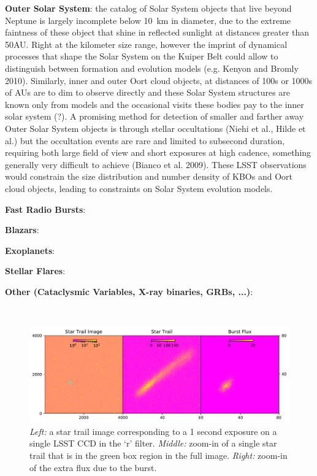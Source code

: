 \documentclass[12pt, letterpaper]{article}
\begin{document}
{\bf Outer Solar System}: the catalog of Solar System objects that live beyond Neptune is largely incomplete below 10~km in diameter, due to the extreme faintness of these object that shine in reflected sunlight at distances greater than 50AU. Right at the kilometer size range, however the imprint of dynamical processes that shape the Solar System on the Kuiper Belt could allow to distinguish between formation and evolution models (e.g. Kenyon and Bromly 2010). Similarly, inner and outer Oort cloud objects, at distances of 100s or 1000s of AUs are to dim to observe directly and these Solar System structures are known only from models and the occasional visits these bodies pay to the inner solar system (?). A promising method for detection of smaller and farther away Outer Solar System objects is through stellar occultations (Niehi et al., Hilde et al.) but the occultation events are rare and limited to subsecond duration, requiring both large field of view and short exposures at high cadence, something generally very difficult to achieve (Bianco et al. 2009). These LSST observations would constrain the size distribution and number density of KBOs and Oort cloud objects, leading to constraints on Solar System evolution models.

{\color{green}

{\bf Fast Radio Bursts}: 

{\bf Blazars}: 

{\bf Exoplanets}: 

{\bf Stellar Flares}: 

{\bf Other (Cataclysmic Variables, X-ray binaries, GRBs, ...)}: 

}
\
\begin{figure}[htb]
\center
\includegraphics[width=1.00\columnwidth]{star_trail.pdf}
\caption{\textit{Left:} a star trail image corresponding to a 1 second exposure on a single LSST CCD in the `r' filter. \textit{Middle:} zoom-in of a single star trail that is in the green box region in the full image. \textit{Right:} zoom-in of the extra flux due to the burst.}
\label{fig:trail}
\end{figure}
\end{document}
